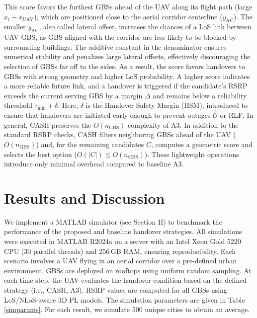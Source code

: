 \documentclass[10pt,conference]{IEEEtran}
\newcommand*\zc[1]{\textcolor{blue}{Zach: #1}}
\begin{document}
This score favors the furthest GBSs ahead of the UAV along its flight path (large $x_i - x_{\text{UAV}}$), which are positioned close to the aerial corridor centerline ($ y_{\text{AC}}$). The smaller $y_{\text{AC}}$, also called lateral offset, increases the chances of a LoS link between UAV-GBS, as GBS aligned with the corridor are less likely to be blocked by surrounding buildings. The additive constant in the denominator ensures numerical stability and penalizes large lateral offsets, effectively discouraging the selection of GBSs far off to the sides. As a result, the score favors handovers to GBSs with strong geometry and higher LoS probability. A higher score indicates a more reliable future link, and a handover is triggered if the candidate’s RSRP exceeds the current serving GBS by a margin $\Delta$ and remains below a reliability threshold $\tau_{\min} + \delta$. Here, $\delta$ is the Handover Safety Margin (HSM), introduced to ensure that handovers are initiated early enough to prevent outages $\hat{\mathcal{O}}$ or RLF. In general, CASH preserves the $O(n_{\text{GBS}})$ complexity of A3. In addition to the standard RSRP checks, CASH filters neighboring GBSs ahead of the UAV ($O(n_{\text{GBS}})$) and, for the remaining candidates $C$, computes a geometric score and selects the best option ($O(|C|) \leq O(n_{\text{GBS}})$). These lightweight operations introduce only minimal overhead compared to baseline A3.







\section{Results and Discussion}
We implement a MATLAB simulator (see Section II) to benchmark the performance of the proposed and baseline handover strategies. All simulations were executed in MATLAB R2024a on a server with an Intel Xeon Gold 5220 CPU (30 parallel threads) and 256\,GB RAM, ensuring reproducibility. Each scenario involves a UAV flying in an aerial corridor over a pre-defined urban environment. GBSs are deployed on rooftops using uniform random sampling. At each time step, the UAV evaluates the handover condition based on the defined strategy (i.e., CASH, A3). RSRP values are computed for all GBSs using LoS/NLoS-aware 3D PL models. The simulation parameters are given in Table \ref{simparams}. For each result, we simulate 500 unique cities to obtain an average.
\end{document}
